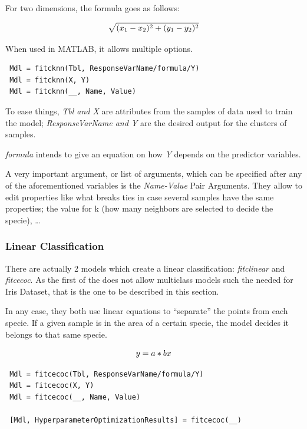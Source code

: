 \documentclass[11pt]{article}
\begin{document}
For two dimensions, the formula goes as follows:

\begin{equation}
 \centering
 \sqrt{(x_1 - x_2)^2 + (y_1 - y_2)^2}
\end{equation}

When used in MATLAB, it allows multiple options.

\begin{verbatim}
 Mdl = fitcknn(Tbl, ResponseVarName/formula/Y)
 Mdl = fitcknn(X, Y)
 Mdl = fitcknn(__, Name, Value)
\end{verbatim}

To ease things, \textit{Tbl and X} are attributes from the samples of data 
used to train the model; \textit{ResponseVarName and Y} are the desired output
for the clusters of samples.

\textit{formula} intends to give an equation on how \textit{Y} depends on the
predictor variables.

A very important argument, or list of arguments, which can be specified after
any of the aforementioned variables is the \textit{Name-Value} Pair Arguments.
They allow to edit properties like what breaks ties in case several samples have
the same properties; the value for k (how many neighbors are selected to decide
the specie), \ldots

\subsubsection{Linear Classification}

There are actually 2 models which create a linear classification:
\textit{fitclinear} and \textit{fitcecoc}. As the first of the does not allow
multiclass models such the needed for Iris Dataset, that is the one to be
described in this section.

In any case, they both use linear equations to ``separate'' the points from each
specie. If a given sample is in the area of a certain specie, the model decides
it belongs to that same specie.

\begin{equation}
 \centering
 y = a * bx
\end{equation}

\begin{verbatim}
 Mdl = fitcecoc(Tbl, ResponseVarName/formula/Y)
 Mdl = fitcecoc(X, Y)
 Mdl = fitcecoc(__, Name, Value)

 [Mdl, HyperparameterOptimizationResults] = fitcecoc(__)
\end{verbatim}
\end{document}
